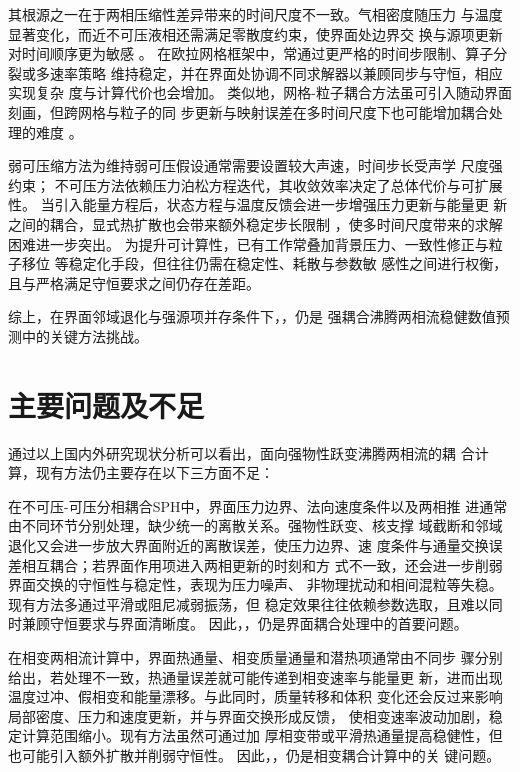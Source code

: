 其根源之一在于两相压缩性差异带来的时间尺度不一致。气相密度随压力
与温度显著变化，而近不可压液相还需满足零散度约束，使界面处边界交
换与源项更新对时间顺序更为敏感
。
在欧拉网格框架中，常通过更严格的时间步限制、算子分裂或多速率策略
维持稳定，并在界面处协调不同求解器以兼顾同步与守恒，相应实现复杂
度与计算代价也会增加。
类似地，网格-粒子耦合方法虽可引入随动界面刻画，但跨网格与粒子的同
步更新与映射误差在多时间尺度下也可能增加耦合处理的难度
。

弱可压缩方法为维持弱可压假设通常需要设置较大声速，时间步长受声学
尺度强约束；
不可压方法依赖压力泊松方程迭代，其收敛效率决定了总体代价与可扩展
性。
当引入能量方程后，状态方程与温度反馈会进一步增强压力更新与能量更
新之间的耦合，显式热扩散也会带来额外稳定步长限制
，使多时间尺度带来的求解困难进一步突出。
为提升可计算性，已有工作常叠加背景压力、一致性修正与粒子移位
等稳定化手段，但往往仍需在稳定性、耗散与参数敏
感性之间进行权衡，且与严格满足守恒要求之间仍存在差距。

综上，在界面邻域退化与强源项并存条件下，，仍是
强耦合沸腾两相流稳健数值预测中的关键方法挑战。

\section{主要问题及不足}

通过以上国内外研究现状分析可以看出，面向强物性跃变沸腾两相流的耦
合计算，现有方法仍主要存在以下三方面不足：

在不可压-可压分相耦合SPH中，界面压力边界、法向速度条件以及两相推
进通常由不同环节分别处理，缺少统一的离散关系。强物性跃变、核支撑
域截断和邻域退化又会进一步放大界面附近的离散误差，使压力边界、速
度条件与通量交换误差相互耦合；若界面作用项进入两相更新的时刻和方
式不一致，还会进一步削弱界面交换的守恒性与稳定性，表现为压力噪声、
非物理扰动和相间混粒等失稳。现有方法多通过平滑或阻尼减弱振荡，但
稳定效果往往依赖参数选取，且难以同时兼顾守恒要求与界面清晰度。
因此，，仍是界面耦合处理中的首要问题。

在相变两相流计算中，界面热通量、相变质量通量和潜热项通常由不同步
骤分别给出，若处理不一致，热通量误差就可能传递到相变速率与能量更
新，进而出现温度过冲、假相变和能量漂移。与此同时，质量转移和体积
变化还会反过来影响局部密度、压力和速度更新，并与界面交换形成反馈，
使相变速率波动加剧，稳定计算范围缩小。现有方法虽然可通过加
厚相变带或平滑热通量提高稳健性，但也可能引入额外扩散并削弱守恒性。
因此，，仍是相变耦合计算中的关
键问题。

